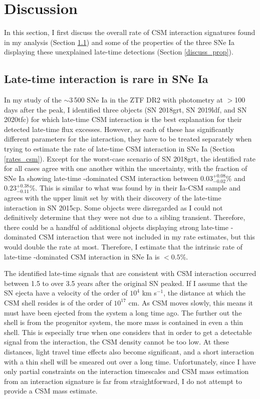 \documentclass[a4paper,oneside,12pt, class=Latex/Classes/PhDthesisPSnPDF, crop=false]{standalone}
\begin{document}
\section{Discussion}
\label{DR2_discussion}
In this section, I first discuss the overall rate of CSM interaction signatures found in my analysis (Section \ref{discuss_interaction}) and some of the properties of the three SNe Ia displaying these unexplained late-time detections (Section \ref{discuss_prop}).


\subsection{Late-time interaction is rare in SNe Ia}
\label{discuss_interaction}
In my study of the $\sim$3\,500 SNe Ia in the ZTF DR2 with photometry at $>$100 days after the peak, I identified three objects (SN 2018grt, SN 2019ldf, and SN 2020tfc) for which late-time CSM interaction is the best explanation for their detected late-time flux excesses. However, as each of these has significantly different parameters for the interaction, they have to be treated separately when trying to estimate the rate of late-time CSM interaction in SNe Ia (Section \ref{rates_csm}). Except for the worst-case scenario of SN 2018grt, the identified rate for all cases agree with one another within the uncertainty, with the fraction of SNe Ia showing late-time \Halpha-dominated CSM interaction between $0.03^{+0.08}_{-0.02}$\% and $0.23^{+0.38}_{-0.11}$\%. This is similar to what was found by \citet{Ia-CSM_BTS} in their Ia-CSM sample and agrees with the upper limit set by \citet{2015cp} with their discovery of the late-time interaction in SN 2015cp. Some objects were disregarded as I could not definitively determine that they were not due to a sibling transient. Therefore, there could be a handful of additional objects displaying strong late-time \Halpha-dominated CSM interaction that were not included in my rate estimates, but this would double the rate at most. Therefore, I estimate that the intrinsic rate of late-time \Halpha-dominated CSM interaction in SNe Ia is $<0.5$\%.

The identified late-time signals that are consistent with CSM interaction occurred between 1.5 to over 3.5 years after the original SN peaked. If I assume that the SN ejecta have a velocity of the order of $10^4$ km s$^{-1}$, the distance at which the CSM shell resides is of the order of $10^{17}$ cm. As CSM moves slowly, this means it must have been ejected from the system a long time ago. The further out the shell is from the progenitor system, the more mass is contained in even a thin shell. This is especially true when one considers that in order to get a detectable signal from the interaction, the CSM density cannot be too low. At these distances, light travel time effects also become significant, and a short interaction with a thin shell will be smeared out over a long time. Unfortunately, since I have only partial constraints on the interaction timescales and CSM mass estimation from an interaction signature is far from straightforward, I do not attempt to provide a CSM mass estimate.
\end{document}
